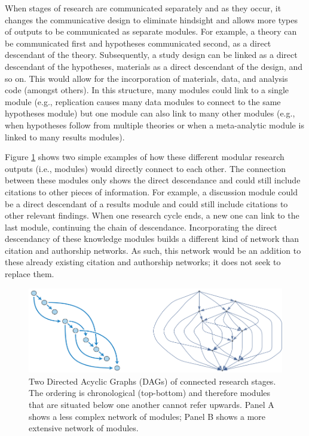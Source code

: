 \documentclass[a5paper]{book}
\begin{document}
When stages of research are communicated separately and as they occur,
it changes the communicative design to eliminate hindsight and allows
more types of outputs to be communicated as separate modules. For
example, a theory can be communicated first and hypotheses communicated
second, as a direct descendant of the theory. Subsequently, a study
design can be linked as a direct descendant of the hypotheses, materials
as a direct descendant of the design, and so on. This would allow for
the incorporation of materials, data, and analysis code (amongst
others). In this structure, many modules could link to a single module
(e.g., replication causes many data modules to connect to the same
hypotheses module) but one module can also link to many other modules
(e.g., when hypotheses follow from multiple theories or when a
meta-analytic module is linked to many results modules).

Figure \ref{fig:asyougo-fig1} shows two simple examples of how these
different modular research outputs (i.e., modules) would directly
connect to each other. The connection between these modules only shows
the direct descendance and could still include citations to other pieces
of information. For example, a discussion module could be a direct
descendant of a results module and could still include citations to
other relevant findings. When one research cycle ends, a new one can
link to the last module, continuing the chain of descendance.
Incorporating the direct descendancy of these knowledge modules builds a
different kind of network than citation and authorship networks. As
such, this network would be an addition to these already existing
citation and authorship networks; it does not seek to replace them.

\begin{figure}
\includegraphics[width=1\linewidth]{assets/figures/Panel with DAGs} \caption{Two Directed Acyclic Graphs (DAGs) of connected research stages. The ordering is chronological (top-bottom) and therefore modules that are situated below one another cannot refer upwards. Panel A shows a less complex network of modules; Panel B shows a more extensive network of modules.}\label{fig:asyougo-fig1}
\end{figure}
\end{document}
